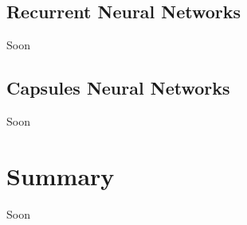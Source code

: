 \vspace{-0.3cm}


\subsection{Recurrent Neural Networks}\label{sec:3.8.2}
\vspace{-0.5cm}
\noindent Soon


\vspace{-0.3cm}

\subsection{Capsules Neural Networks}\label{sec:3.8.3}
\vspace{-0.5cm}
\noindent Soon


\vspace{-0.3cm}




\section{Summary}\label{sec:3.9}
\vspace{-0.5cm}
\noindent Soon

\vspace{-0.3cm}



